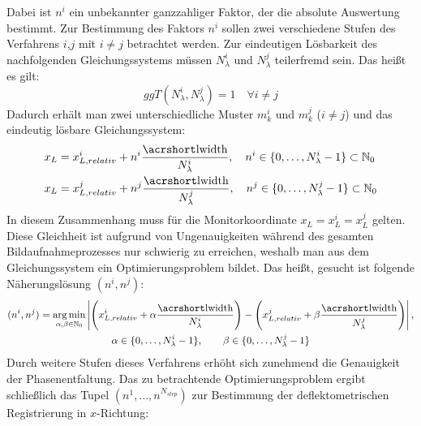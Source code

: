 %
Dabei ist $n^i$ ein unbekannter ganzzahliger Faktor, der die absolute Auswertung bestimmt.
Zur Bestimmung des Faktors $n^i$ sollen zwei verschiedene Stufen des Verfahrens $i$,$j$ mit $i \neq j$ betrachtet werden.
Zur eindeutigen Lösbarkeit des nachfolgenden Gleichungssystems müssen $N_\lambda^i$ und $N_\lambda^j$ teilerfremd sein.
Das heißt es gilt:
%
\begin{equation*}
	ggT(N_\lambda^i, N_\lambda^j) = 1
	\quad
	\forall i \neq j
\end{equation*}
%
Dadurch erhält man zwei unterschiedliche Muster $m_k^i$ und $m_k^j$ ($i \neq j$) und das eindeutig lösbare Gleichungssystem:
%
\begin{equation}\label{eq:gleichungssystemRegistrierung}
	\begin{split}
		x_L & = x_{L,relativ}^i + n^i \dfrac{\acrshortmath{lwidth}}{N_\lambda^i},
		\quad n^i \in \lbrace 0,\ldots, N_\lambda^i - 1 \rbrace \subset \mathbb{N}_0\\
		x_L & = x_{L,relativ}^j + n^j \dfrac{\acrshortmath{lwidth}}{N_\lambda^j},
		\quad n^j \in \lbrace 0,\ldots, N_\lambda^j - 1 \rbrace \subset \mathbb{N}_0
	\end{split}
\end{equation}
%
In diesem Zusammenhang muss für die Monitorkoordinate $x_L = x_L^i = x_L^j$ gelten.
Diese Gleichheit ist aufgrund von Ungenauigkeiten während des gesamten Bildaufnahmeprozesses nur schwierig zu erreichen, weshalb man aus dem Gleichungssystem ein Optimierungsproblem bildet.
Das heißt, gesucht ist folgende Näherungslösung $(n^i, n^j)$:
%
\begin{equation}\label{eq:optimierungsProblem_zweiStufen}
	\begin{gathered}	
		(n^i, n^j) = \argmin_{\alpha, \beta \in \mathbb{N}_0}
		\left\lvert
			\Bigg(
				x_{L,relativ}^i + \alpha \dfrac{\acrshortmath{lwidth}}{N_\lambda^i}
			\Bigg)
			-
			\Bigg(		
				x_{L,relativ}^j + \beta \dfrac{\acrshortmath{lwidth}}{N_\lambda^j}
			\Bigg)
		\right\rvert,\\
		\alpha \in \lbrace 0,\ldots, N_\lambda^i - 1\rbrace,
		\qquad
		\beta \in \lbrace 0,\ldots, N_\lambda^j - 1\rbrace
	\end{gathered}
\end{equation}
%
Durch weitere Stufen dieses Verfahrens erhöht sich zunehmend die Genauigkeit der Phasenentfaltung.
Das zu betrachtende Optimierungsproblem ergibt schließlich das Tupel $(n^1,\ldots, n^{N_{step}})$ zur Bestimmung der deflektometrischen Registrierung in $x$-Richtung:
%
